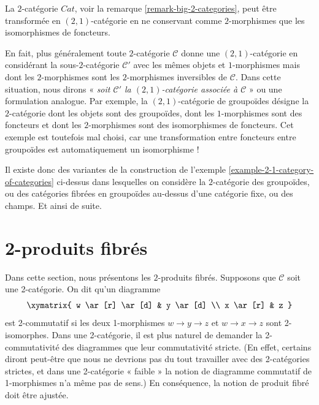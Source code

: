 \begin{example}
\label{example-2-1-category-of-categories}
La $2$-catégorie $\textit{Cat}$, voir la remarque
\ref{remark-big-2-categories}, peut être transformée en $(2, 1)$-catégorie en
ne conservant comme $2$-morphismes que les isomorphismes de foncteurs.
\end{example}

\noindent
En fait, plus généralement toute $2$-catégorie $\mathcal{C}$ donne une
$(2, 1)$-catégorie en considérant la sous-$2$-catégorie $\mathcal{C}'$ avec
les mêmes objets et $1$-morphismes mais dont les $2$-morphismes sont les
$2$-morphismes inversibles de $\mathcal{C}$. Dans cette situation, nous dirons
« {\it soit $\mathcal{C}'$ la $(2, 1)$-catégorie associée à
$\mathcal{C}$} » ou une formulation analogue. Par exemple, la $(2, 1)$-catégorie de
groupoïdes désigne la $2$-catégorie dont les objets sont des groupoïdes, dont
les $1$-morphismes sont des foncteurs et dont les $2$-morphismes sont des
isomorphismes de foncteurs. Cet exemple est toutefois mal choisi, car une
transformation entre foncteurs entre groupoïdes est automatiquement un
isomorphisme !

\begin{remark}
\label{remark-other-2-categories}
Il existe donc des variantes de la construction de l'exemple
\ref{example-2-1-category-of-categories} ci-dessus dans lesquelles on considère la
$2$-catégorie des groupoïdes, ou des catégories fibrées en groupoïdes au-dessus d'une
catégorie fixe, ou des champs. Et ainsi de suite.
\end{remark}






\section{2-produits fibrés}
\label{section-2-fibre-products}

\noindent
Dans cette section, nous présentons les $2$-produits fibrés. Supposons que
$\mathcal{C}$ soit une 2-catégorie. On dit qu'un diagramme
$$
\xymatrix{
w \ar[r] \ar[d] & y \ar[d] \\
x \ar[r] & z }
$$
est 2-commutatif si les deux 1-morphismes $w \to y \to z$ et $w \to x \to z$ sont
2-isomorphes. Dans une 2-catégorie, il est plus naturel de demander la
2-commutativité des diagrammes que leur commutativité stricte. (En
effet, certains diront peut-être que nous ne devrions pas du tout travailler
avec des 2-catégories strictes, et dans une 2-catégorie « faible » la notion
de diagramme commutatif de 1-morphismes n'a même pas de sens.) En conséquence,
la notion de produit fibré doit être ajustée.


